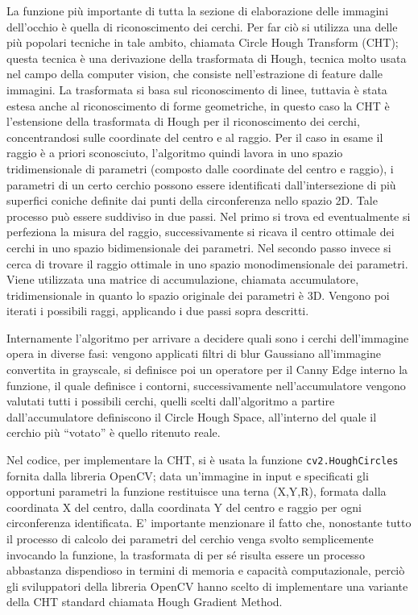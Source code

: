 La funzione più importante di tutta la sezione di elaborazione delle immagini  dell’occhio è quella di riconoscimento dei cerchi. Per far ciò si utilizza una delle più popolari tecniche in tale ambito, chiamata Circle Hough Transform (CHT); questa tecnica è una derivazione della trasformata di Hough, tecnica molto usata nel campo della computer vision, che consiste nell’estrazione di feature dalle immagini. La trasformata si basa sul riconoscimento di linee, tuttavia è stata estesa anche al riconoscimento di forme geometriche, in questo caso la CHT è l’estensione della trasformata di Hough per il riconoscimento dei cerchi, concentrandosi sulle coordinate del centro e al raggio. Per il caso in esame il raggio è a priori sconosciuto, l'algoritmo quindi lavora in uno spazio tridimensionale di parametri (composto dalle coordinate del centro e raggio), i parametri di un certo cerchio possono essere identificati dall’intersezione di più superfici coniche definite dai punti della circonferenza nello spazio 2D. Tale processo può essere suddiviso in due passi. Nel primo si trova ed eventualmente si perfeziona la misura del raggio, successivamente si ricava il centro ottimale dei cerchi in uno spazio bidimensionale dei parametri. Nel secondo passo invece si cerca di trovare il raggio ottimale in uno spazio monodimensionale dei parametri. Viene utilizzata una matrice di accumulazione, chiamata accumulatore, tridimensionale in quanto lo spazio originale dei parametri è 3D. Vengono poi iterati i possibili raggi, applicando i due passi sopra descritti.
 
Internamente l’algoritmo per arrivare a decidere quali sono i cerchi dell’immagine opera in diverse fasi: vengono applicati filtri di blur Gaussiano all’immagine convertita in grayscale, si definisce poi un operatore per il Canny Edge interno la funzione, il quale definisce i contorni, successivamente nell’accumulatore vengono valutati tutti i possibili cerchi, quelli scelti dall’algoritmo a partire dall’accumulatore definiscono il Circle Hough Space, all’interno del quale il cerchio più “votato” è quello ritenuto reale.

Nel codice, per implementare la CHT, si è usata la funzione \texttt{cv2.HoughCircles} fornita dalla libreria OpenCV; data un'immagine in input e specificati gli opportuni parametri la funzione restituisce una terna (X,Y,R), formata dalla coordinata X del centro, dalla coordinata Y del centro e raggio per ogni circonferenza identificata. E’ importante menzionare il fatto che, nonostante tutto il processo di calcolo dei parametri del cerchio venga svolto semplicemente invocando la funzione, la trasformata di per sé risulta essere un processo abbastanza dispendioso in termini di memoria e capacità computazionale, perciò gli sviluppatori della libreria OpenCV hanno scelto di implementare una variante della CHT standard chiamata Hough Gradient Method.


